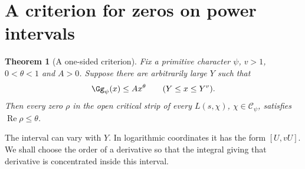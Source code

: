 \documentclass[a4paper,11pt]{article}
\newtheorem{theorem}[proposition]{Theorem}
\theoremstyle{definition}
\theoremstyle{remark}
\newcommand{\real}{\operatorname{Re}}\newcommand{\imag}{\operatorname{Im}}
\numberwithin{equation}{section}
\begin{document}
\section{A criterion for zeros on power intervals}\label{nav:I-02}
\label{sect:analytic}
\begin{theorem}[A one-sided criterion]\label{thm:detect}
Fix a primitive character \(\psi\), \(v>1\), \(0<\theta<1\) and \(A>0\). Suppose there are arbitrarily large \(Y\) such that
\[
              \Gg_\psi(x)\le A x^\theta\qquad(Y\le x\le Y^v).
\]
Then every zero \(\rho\) in the open critical strip of every \(L(s,\chi)\), \(\chi\in\mathcal C_\psi\), satisfies \(\real\rho\le\theta\).
\end{theorem}
The interval can vary with \(Y\). In logarithmic coordinates it has the form \([U,vU]\). We shall choose the order of a derivative so that the integral giving that derivative is concentrated inside this interval.
\end{document}
